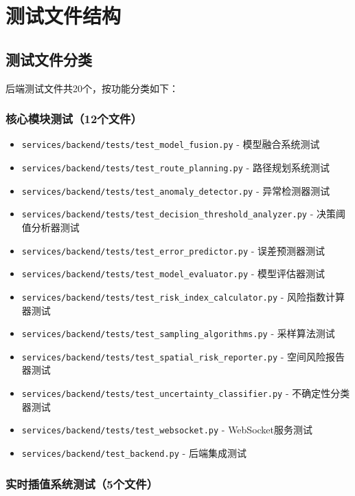 \documentclass[12pt,a4paper,openany]{report}
\begin{document}
\section{测试文件结构}

\subsection{测试文件分类}

后端测试文件共20个，按功能分类如下：

\subsubsection{核心模块测试（12个文件）}

\begin{itemize}
    \item \texttt{services/backend/tests/test\_model\_fusion.py} - 模型融合系统测试
    \item \texttt{services/backend/tests/test\_route\_planning.py} - 路径规划系统测试
    \item \texttt{services/backend/tests/test\_anomaly\_detector.py} - 异常检测器测试
    \item \texttt{services/backend/tests/test\_decision\_threshold\_analyzer.py} - 决策阈值分析器测试
    \item \texttt{services/backend/tests/test\_error\_predictor.py} - 误差预测器测试
    \item \texttt{services/backend/tests/test\_model\_evaluator.py} - 模型评估器测试
    \item \texttt{services/backend/tests/test\_risk\_index\_calculator.py} - 风险指数计算器测试
    \item \texttt{services/backend/tests/test\_sampling\_algorithms.py} - 采样算法测试
    \item \texttt{services/backend/tests/test\_spatial\_risk\_reporter.py} - 空间风险报告器测试
    \item \texttt{services/backend/tests/test\_uncertainty\_classifier.py} - 不确定性分类器测试
    \item \texttt{services/backend/tests/test\_websocket.py} - WebSocket服务测试
    \item \texttt{services/backend/test\_backend.py} - 后端集成测试
\end{itemize}

\subsubsection{实时插值系统测试（5个文件）}
\end{document}
